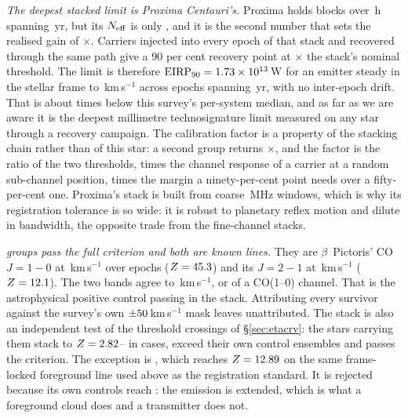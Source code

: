 \emph{The deepest stacked limit is Proxima Centauri's.} Proxima holds
\StkProxN{} blocks over \StkProxHours\,h spanning \StkProxSpanYr\,yr, but
its $N_{\rm eff}$ is only \StkProxNeff, and it is the second number that
sets the realised gain of \StkProxGain$\times$. Carriers injected into every
epoch of that stack and recovered through the same path give a 90 per cent
recovery point at \StkCalMult$\times$ the stack's nominal threshold. The
limit is therefore
$\mathrm{EIRP}_{90}=1.73\times10^{13}$\,W for an emitter steady in the
stellar frame to \StkProxTolKms\,km\,s$^{-1}$ across epochs spanning
\StkProxSpanYr\,yr, with no inter-epoch drift. That is about
\StkProxBelowMed{} times below this survey's per-system median, and as far as
we are aware it is the deepest millimetre technosignature limit measured on
any star through a recovery campaign. The calibration factor is a property of
the stacking chain rather than of this star: a second group returns
\StkCalMultTwo$\times$, and the factor is the ratio of the two thresholds,
times the channel response of a carrier at a random sub-channel position,
times the margin a ninety-per-cent point needs over a fifty-per-cent one.
Proxima's stack is built from coarse \ChanBModeMHz\,MHz windows, which is
why its registration tolerance is so wide: it is robust to planetary reflex
motion and dilute in bandwidth, the opposite trade from the fine-channel
stacks.

\emph{\StkNSurvive{} groups pass the full criterion and both are known lines.} They are
$\beta$~Pictoris' CO $J=1\!-\!0$ at \StkBpCoOneOff\,km\,s$^{-1}$ over
\StkBpCoOneN{} epochs ($Z=45.3$) and its $J=2\!-\!1$ at
\StkBpCoTwoOff\,km\,s$^{-1}$ ($Z=12.1$). The two bands agree to
\StkBpCrossKms\,km\,s$^{-1}$, or \StkBpCrossChan{} of a CO(1--0) channel.
That is the astrophysical positive control passing in the stack. Attributing
every survivor against the survey's own $\pm50$\,km\,s$^{-1}$ mask
leaves \StkNUnattributedComputed{} unattributed. The stack is also an
independent test of the threshold crossings of \S\ref{sec:etacrv}: the
\StkNPersistStar{} stars carrying them stack to
$Z=2.82$--\StkPersistZHi{} in \StkNPersistBelow{} cases,
\StkNPersistAboveCtrl{} exceed their own control ensembles and
\StkNPersistSurvive{} passes the criterion. The exception is
\StkPersistLineStar, which reaches $Z=12.89$ on the same
frame-locked foreground line used above as the registration standard. It is
rejected because its own controls reach \StkPersistLineCtrl: the emission is
extended, which is what a foreground cloud does and a transmitter does not.

